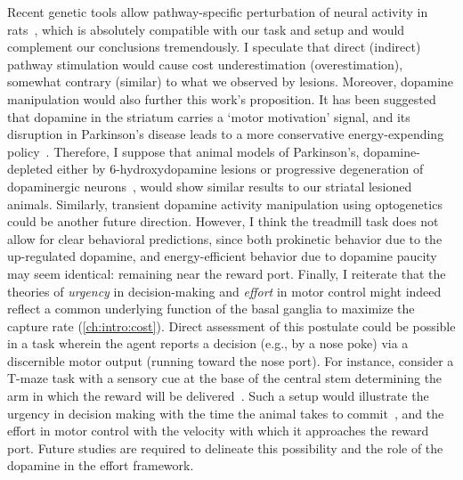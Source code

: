 Recent genetic tools allow pathway-specific perturbation of neural activity in rats~\cite{Pettibone2019eNeuro}, which is absolutely compatible with our task and setup and would complement our conclusions tremendously.
I speculate that direct (indirect) pathway stimulation would cause cost underestimation (overestimation), somewhat contrary (similar) to what we observed by lesions.
Moreover, dopamine manipulation would also further this work's proposition.
It has been suggested that dopamine in the striatum carries a `motor motivation' signal, and its disruption in Parkinson's disease leads to a more conservative energy-expending policy~\cite{Mazzoni2007}.
Therefore, I suppose that animal models of Parkinson's, dopamine-depleted either by 6-hydroxydopamine lesions or progressive degeneration of dopaminergic neurons~\cite{Panigrahi2015Cell}, would show similar results to our striatal lesioned animals.
Similarly, transient dopamine activity manipulation using optogenetics could be another future direction.
However, I think the treadmill task does not allow for clear behavioral predictions, since both prokinetic behavior due to the up-regulated dopamine, and energy-efficient behavior due to dopamine paucity may seem identical:
remaining near the reward port.
Finally, I reiterate that the theories of \emph{urgency}\! in decision-making and \emph{effort}\! in motor control might indeed reflect a common underlying function of the basal ganglia to maximize the capture rate (\autoref{ch:intro:cost}).
Direct assessment of this postulate could be possible in a task wherein the agent reports a decision (e.g., by a nose poke) via a discernible motor output (running toward the nose port).
For instance, consider a T-maze task with a sensory cue at the base of the central stem determining the arm in which the reward will be delivered~\cite[i.e., a combination of][]{Zuo2019CurrBiol,Engelhard2019N}.
Such a setup would illustrate the urgency in decision making with the time the animal takes to commit~\cite{Thura2017Neruon}, and the effort in motor control with the velocity with which it approaches the reward port.
Future studies are required to delineate this possibility and the role of the dopamine in the effort framework.
